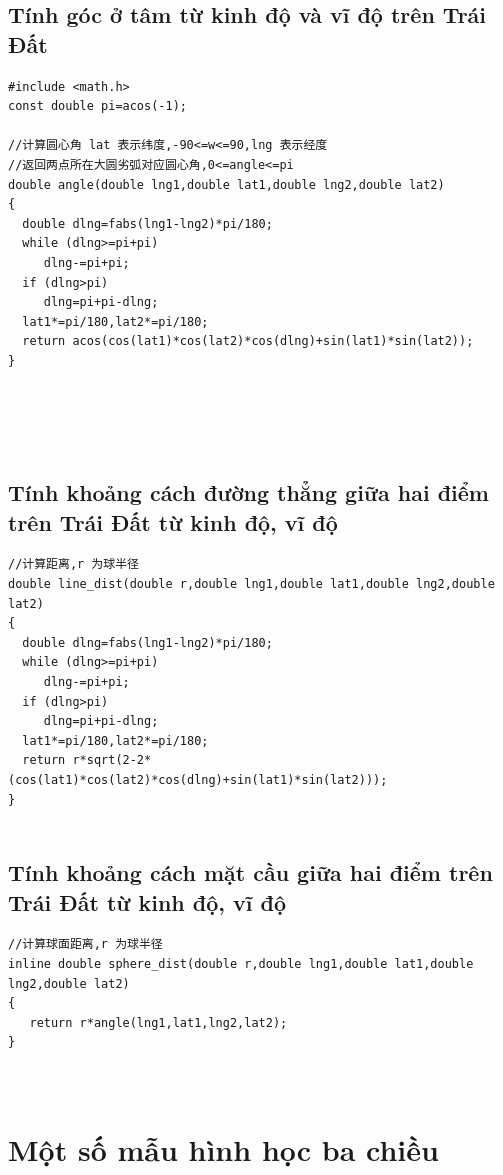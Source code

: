 \documentclass[11pt]{article}
\begin{document}
\subsection{Tính góc ở tâm từ kinh độ và vĩ độ trên Trái Đất}
\begingroup
\scriptsize
\begin{verbatim}
#include <math.h>
const double pi=acos(-1);

//计算圆心角 lat 表示纬度,-90<=w<=90,lng 表示经度
//返回两点所在大圆劣弧对应圆心角,0<=angle<=pi
double angle(double lng1,double lat1,double lng2,double lat2)
{
  double dlng=fabs(lng1-lng2)*pi/180;
  while (dlng>=pi+pi)
     dlng-=pi+pi;
  if (dlng>pi)
     dlng=pi+pi-dlng;
  lat1*=pi/180,lat2*=pi/180;
  return acos(cos(lat1)*cos(lat2)*cos(dlng)+sin(lat1)*sin(lat2));
}





\end{verbatim}
\endgroup
\subsection{Tính khoảng cách đường thẳng giữa hai điểm trên Trái Đất từ kinh độ, vĩ độ}
\begingroup
\scriptsize
\begin{verbatim}
//计算距离,r 为球半径
double line_dist(double r,double lng1,double lat1,double lng2,double lat2)
{
  double dlng=fabs(lng1-lng2)*pi/180;
  while (dlng>=pi+pi)
     dlng-=pi+pi;
  if (dlng>pi)
     dlng=pi+pi-dlng;
  lat1*=pi/180,lat2*=pi/180;
  return r*sqrt(2-2*(cos(lat1)*cos(lat2)*cos(dlng)+sin(lat1)*sin(lat2)));
}


\end{verbatim}
\endgroup
\subsection{Tính khoảng cách mặt cầu giữa hai điểm trên Trái Đất từ kinh độ, vĩ độ}
\begingroup
\scriptsize
\begin{verbatim}
//计算球面距离,r 为球半径
inline double sphere_dist(double r,double lng1,double lat1,double lng2,double lat2)
{
   return r*angle(lng1,lat1,lng2,lat2);
}



\end{verbatim}
\endgroup
\section{Một số mẫu hình học ba chiều}
\end{document}
